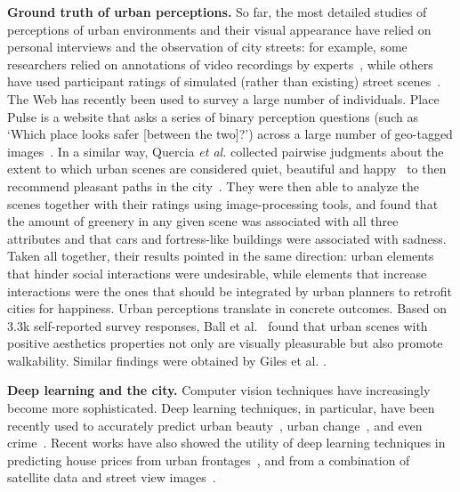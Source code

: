 \vspace{4pt}\noindent
\textbf{Ground truth of urban perceptions.} So far, the most detailed studies of perceptions of urban environments and their visual appearance have relied on personal interviews and the observation of city streets: for example, some researchers relied on annotations of video recordings by experts~\cite{sampson04seeing}, while others have used participant ratings of simulated (rather than existing) street scenes~\cite{lindal2012}. The Web has recently been used to survey a large number of individuals. Place Pulse is a website that asks a series of binary perception questions (such as `Which place looks safer [between the two]?') across a large number of geo-tagged images~\cite{salesses2013collaborative}. In a similar way, Quercia \emph{et al.} collected pairwise judgments about the extent to which urban scenes are considered quiet, beautiful and happy~\cite{quercia2014aesthetic} to then recommend pleasant paths in the city~\cite{quercia2014shortest}. They were then able to analyze the scenes together with their ratings using image-processing tools, and found that the amount of greenery in any given scene was associated with all three attributes and that cars and fortress-like buildings were associated with sadness. Taken all together, their results pointed in the same direction: urban elements that hinder social interactions were undesirable, while elements that increase interactions were the ones that should be integrated by urban planners to retrofit cities for happiness. Urban perceptions translate in concrete outcomes. Based on 3.3k self-reported survey responses,  Ball et al.~\cite{ball2001perceived} found that urban scenes with positive aesthetics properties  not only are visually  pleasurable but also promote walkability. Similar findings were obtained by Giles et al. \cite{giles2005increasing}.

\vspace{4pt}\noindent
\textbf{Deep learning and the city.} Computer vision techniques have increasingly become more sophisticated. Deep learning techniques, in particular, have been recently used to accurately predict urban beauty~\cite{dubey2016deep,seresinhe2017using}, urban change~\cite{naik2017computer}, and even crime~\cite{DeNadai16,arietta2014city}.  Recent works have also showed the utility of deep learning techniques in predicting house prices from urban frontages~\cite{frontage}, and from a combination of satellite data and street view images~\cite{law2018take}.

